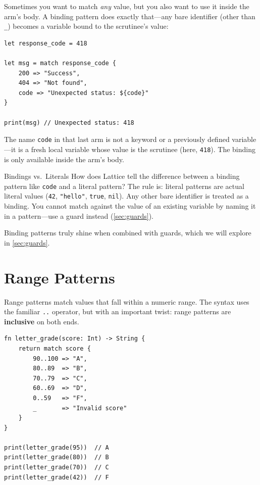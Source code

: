 Sometimes you want to match \emph{any} value, but you also want to use it inside the arm's body. A binding pattern does exactly that---any bare identifier (other than \lstinline|_|) becomes a variable bound to the scrutinee's value:

\begin{lstlisting}[language=Lattice, caption={Binding patterns capture the scrutinee}]
let response_code = 418

let msg = match response_code {
    200 => "Success",
    404 => "Not found",
    code => "Unexpected status: ${code}"
}

print(msg) // Unexpected status: 418
\end{lstlisting}

The name \lstinline|code| in that last arm is not a keyword or a previously defined variable---it is a fresh local variable whose value is the scrutinee (here, \lstinline|418|). The binding is only available inside the arm's body.

\begin{notebox}{Bindings vs.\ Literals}
How does Lattice tell the difference between a binding pattern like \lstinline|code| and a literal pattern? The rule is: literal patterns are actual literal values (\lstinline|42|, \lstinline|"hello"|, \lstinline|true|, \lstinline|nil|). Any other bare identifier is treated as a binding. You cannot match against the value of an existing variable by naming it in a pattern---use a guard instead (\cref{sec:guards}).
\end{notebox}

Binding patterns truly shine when combined with guards, which we will explore in \cref{sec:guards}.

\section{Range Patterns}\label{sec:range-patterns}

Range patterns match values that fall within a numeric range. The syntax uses the familiar \lstinline|..| operator, but with an important twist: range patterns are \textbf{inclusive} on both ends.

\begin{lstlisting}[language=Lattice, caption={Grading with range patterns}]
fn letter_grade(score: Int) -> String {
    return match score {
        90..100 => "A",
        80..89  => "B",
        70..79  => "C",
        60..69  => "D",
        0..59   => "F",
        _       => "Invalid score"
    }
}

print(letter_grade(95))  // A
print(letter_grade(80))  // B
print(letter_grade(70))  // C
print(letter_grade(42))  // F
\end{lstlisting}

